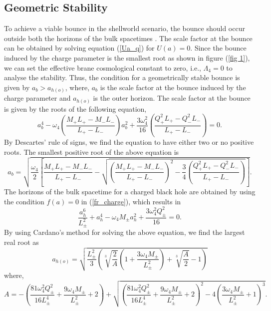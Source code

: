 \documentclass[12pt]{article}
\begin{document}
\subsection{Geometric Stability}\label{sec4}
To achieve a viable bounce in the shellworld scenario, the bounce should occur outside both the horizons of the bulk spacetimes \cite{DeRisi:2007dn}. The scale factor at the bounce can be obtained by solving equation (\ref{Ua_q}) for $U(a)=0$. Since the bounce induced by the charge parameter is the smallest root as shown in figure (\ref{fig 1}), we can set the effective brane cosmological constant to zero, i.e., $\Lambda_4=0$ to analyse the stability. Thus, the condition for a geometrically stable bounce is given by $a_b>a_{h(o)}$, where, $a_b$ is the scale factor at the bounce induced by the charge parameter and $a_{h(o)}$ is the outer horizon.  The scale factor at the bounce is given by the roots of the following equation,
\begin{equation}
	a_b^4-\omega_4\left(\frac{M_+L_+-M_-L_-}{L_+-L_-}\right)a_b^2+\frac{3\omega_4^2}{16}\left(\frac{Q_+^2L_+-Q_-^2L_-}{L_+-L_-}\right)=0.
\end{equation}
By Descartes' rule of signs, we find the equation to have either two or no positive roots. The smallest positive root of the above equation is
\begin{equation}
	a_b=
\sqrt{\frac{\omega_4}{2}\left[\frac{M_+L_+-M_-L_-}{L_+-L_-}-\sqrt{\left(\frac{M_+L_+-M_-L_-}{L_+-L_-}\right)^2-\frac{3}{4}
\left(\frac{Q_+^2L_+-Q_-^2L_-}{L_+-L_-}\right)
}\right]}.
\end{equation}
The horizons of the bulk spacetime for a charged black hole are obtained by using the condition $f(a)=0$ in (\ref{fr_charge}), which results in
\begin{equation}\label{6_poly}
	\frac{a_h^6}{L_{\pm}^2}+a_h^4-\omega_4 M_{\pm} a_h^2+\frac{3\omega_4^2 Q_{\pm}^2}{16}=0.
\end{equation}
By using Cardano's method for solving the above equation, we find the largest real root as
\begin{equation}
a_{h(o)}=\sqrt{\frac{L_\pm^2}{3}\left(\sqrt[3]{\frac{2}{A}} \left( 1+\frac{3 \omega_4 M_\pm}{L_\pm^2}\right)+\sqrt[3]{\frac{A}{2}}-1\right)}
\end{equation}
where,
\begin{equation}
A=-\left(
\frac{81\omega_4^2Q_\pm^2}{16L_\pm^4}+\frac{9\omega_4 M_\pm}{L_\pm^2}+2\right)+\sqrt{\left(
\frac{81\omega_4^2Q_\pm^2}{16L_\pm^4}
+\frac{9\omega_4 M_\pm}{L_\pm^2}
+2\right)^2-4\left(\frac{3\omega_4 M_\pm}{L_\pm^2}+1\right)^3}.
\end{equation}
\end{document}
